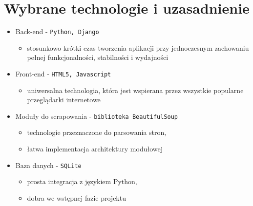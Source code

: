 \documentclass[12pt, titlepage]{article}
\begin{document}
	\section{Wybrane technologie i uzasadnienie}
	\begin{itemize}
		\item Back-end - \texttt{Python, Django}
		\begin{itemize}
			\item stosunkowo krótki czas tworzenia aplikacji przy jednoczesnym zachowaniu pełnej funkcjonalności, stabilności i wydajności
		\end{itemize}
		\item Front-end - \texttt{HTML5, Javascript}
		\begin{itemize}
			\item uniwersalna technologia, która jest wspierana przez wszystkie popularne przeglądarki internetowe
		\end{itemize}
		\item Moduły do scrapowania - \texttt{biblioteka BeautifulSoup}
		\begin{itemize}
			\item technologie przeznaczone do parsowania stron,
			\item łatwa implementacja architektury modułowej
		\end{itemize}
		\item Baza danych - \texttt{SQLite}
		\begin{itemize}
			\item prosta integracja z językiem Python,
			\item dobra we wstępnej fazie projektu
		\end{itemize}
	\end{itemize}
\end{document}
